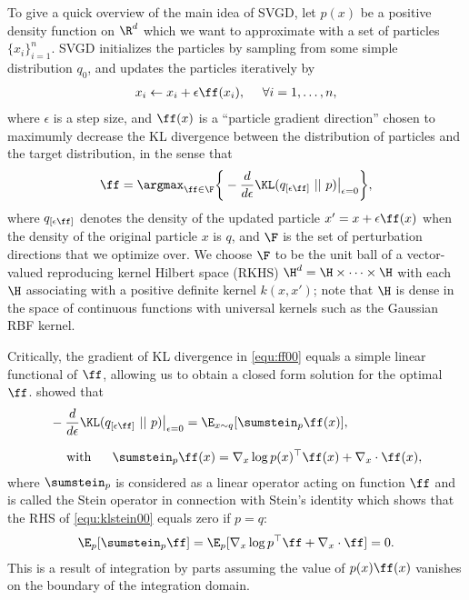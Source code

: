 \documentclass{article} \usepackage{iclr2017_conference,times}
\begin{document}
To give a quick overview of the main idea of SVGD, let $p(x)$ be a positive density function on $\R^d$ which we want to 
approximate with a set of particles 
$\{ x_i\}_{i=1}^n$. 
SVGD initializes the particles by sampling from some simple distribution $q_0$, and 
updates the particles iteratively by 
\begin{align}\label{equ:xxii}
x_i  \gets x_i +  \epsilon \ff(x_i),  ~~~~ \forall i = 1, \ldots, n,  
\end{align}
where $\epsilon$ is a step size, and 
$\ff(x)$ is a ``particle gradient direction'' chosen to maximumly decrease the KL divergence between the distribution of particles and the target distribution, in the sense that  
\begin{align}\label{equ:ff00}
\ff =   \argmax_{\ff \in \F}  \bigg\{  -   \frac{d}{d\epsilon} \KL(q_{[\epsilon\ff]} ~|| ~ p) \big |_{\epsilon = 0}  \bigg\}, 
\end{align}
where $q_{[\epsilon \ff]}$ denotes the density of the updated particle $x^\prime = x + \epsilon \ff(x) $ when the density of the original particle $x$ is $q$, and $\F$ is the set of perturbation directions that we optimize over. 
We choose $\F$ to be the unit ball of a vector-valued reproducing kernel Hilbert space (RKHS) $\H^d = \H \times \cdots \times \H$ with each $\H$ associating with a positive definite kernel $k(x,x')$; 
note that $\H$ is dense in the space of continuous functions with universal kernels such as the Gaussian RBF kernel. 


Critically, the gradient of KL divergence in \eqref{equ:ff00} 
equals a simple linear functional of $\ff$, allowing us to obtain a closed form solution for the optimal $\ff$. 
\citet{liu2016stein} showed that 
\begin{align}\label{equ:klstein00}
&- \frac{d}{d\epsilon} \KL(q_{[\epsilon\ff]} ~|| ~ p) \big |_{\epsilon = 0}  = \E_{x\sim q}[\sumstein_p \ff(x)], \\[.5\baselineskip]
&~~~~\text{with}~~~~~ \sumstein_p \ff(x)  = \nabla_x \log p(x) ^\top \ff (x)+ \nabla_x \cdot \ff(x),  
\end{align}
where $\sumstein_p$ is considered as a linear operator acting on function $\ff$ and is called the Stein operator in connection with Stein's identity which shows that 
the RHS of \eqref{equ:klstein00} equals zero if $p = q$: 
\begin{align}\label{equ:steinid}
\E_{p}[\sumstein_p \ff] =\E_{p}[ \nabla_x \log p ^\top \ff + \nabla_x \cdot \ff] = 0. 
\end{align}
This is a result of integration by parts assuming the value of $p(x)\ff(x)$ vanishes on the boundary of the integration domain.   
\end{document}
